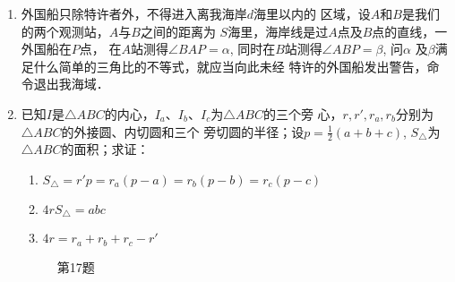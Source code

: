 \begin{enumerate}
\item 外国船只除特许者外，不得进入离我海岸$d$海里以内的
区域，设$A$和$B$是我们的两个观测站，$A$与$B$之间的距离为
$S$海里，海岸线是过$A$点及$B$点的直线，一外国船在$P$点，
在$A$站测得$\angle BAP=\alpha$, 同时在$B$站测得$\angle ABP=\beta$, 问$\alpha$
及$\beta$满足什么简单的三角比的不等式，就应当向此未经
特许的外国船发出警告，命令退出我海域．
\item 已知$I$是$\triangle ABC$的内心，$I_a$、$I_b$、$I_c$为$\triangle ABC$的三个旁
心，$r,r',r_a,r_b$分别为$\triangle ABC$的外接圆、内切圆和三个
旁切圆的半径；设$p=\frac{1}{2}(a+b+c)$, $S_{\triangle}$为$\triangle ABC$的面积；求证：
\begin{enumerate}
    \item $S_{\triangle}=r'p=r_a(p-a)=r_b(p-b)=r_c(p-c)$
    \item $4rS_{\triangle}=abc$
    \item $4r=r_a+r_b+r_c-r'$
\end{enumerate}

\begin{figure}[htp]
    \centering
{}
    \caption*{第17题}
\end{figure}


\end{enumerate}